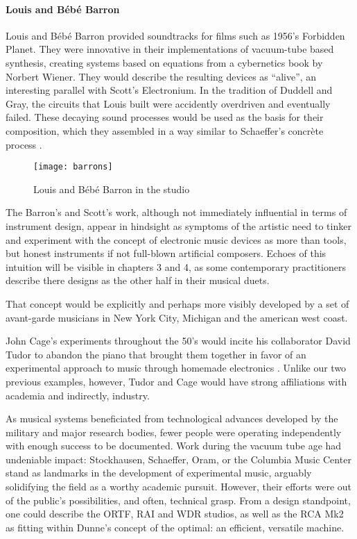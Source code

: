 \begin{itemize}
\paragraph{Louis and Bébé Barron}

Louis and Bébé Barron provided soundtracks for films such as 1956’s Forbidden Planet. They were innovative in their implementations of vacuum-tube based synthesis, creating systems based on equations from a cybernetics book by Norbert Wiener. They would describe the resulting devices as ``alive'', an interesting parallel with Scott’s Electronium. In the tradition of Duddell and Gray, the circuits that Louis built were accidently overdriven and eventually failed. These decaying sound processes would be used as the basis for their composition, which they assembled in a way similar to Schaeffer’s concrète process \citep{dunbar2010}.

	\begin{figure}[h!]
	  \caption{Louis and Bébé Barron in the studio}
	  \centering
	    \texttt{[image: barrons]}
	\end{figure} 
	
The Barron's and Scott's work, although not immediately influential in terms of instrument design, appear in hindsight as symptoms of the artistic need to tinker and experiment with the concept of electronic music devices as more than tools, but honest instruments if not full-blown artificial composers. Echoes of this intuition will be visible in chapters 3 and 4, as some contemporary practitioners describe there designs as the other half in their musical duets. 

That concept would be explicitly and perhaps more visibly developed by a set of avant-garde musicians in New York City, Michigan and the american west coast. 

John Cage’s experiments throughout the 50’s would incite his collaborator David Tudor to abandon the piano that brought them together in favor of an experimental approach to music through homemade electronics \citep{holzaepfel1994,collins2004}. Unlike our two previous examples, however, Tudor and Cage would have strong affiliations with academia and indirectly, industry. 

As musical systems beneficiated from technological advances developed by the military and major research bodies, fewer people were operating independently with enough success to be documented. Work during the vacuum tube age had undeniable impact: Stockhausen, Schaeffer, Oram, or the Columbia Music Center stand as landmarks in the development of experimental music, arguably solidifying the field as a worthy academic pursuit. However, their efforts were out of the public's possibilities, and often, technical grasp. From a design standpoint, one could describe the ORTF, RAI and WDR studios, as well as the RCA Mk2 as fitting within Dunne's concept of the optimal: an efficient, versatile machine. 


\end{itemize}
